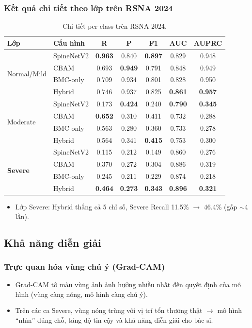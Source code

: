 \documentclass{beamer}
\numberwithin{figure}{section}
\numberwithin{table}{section}
\begin{document}
\begin{frame}
\frametitle{Kết quả chi tiết theo lớp trên RSNA 2024}
\begin{table}
\centering
\scriptsize
\setlength{\tabcolsep}{4pt}
\renewcommand{\arraystretch}{1.05}
\begin{tabular}{llccccc}
\toprule
\textbf{Lớp} & \textbf{Cấu hình} & R & P & F1 & AUC & AUPRC \\
\midrule
\multirow{4}{*}{Normal/Mild}
 & SpineNetV2 & \textbf{0.963} & 0.840 & \textbf{0.897} & 0.829 & 0.948 \\
 & CBAM       & 0.693 & \textbf{0.949} & 0.791 & 0.848 & 0.949 \\
 & BMC-only   & 0.709 & 0.934 & 0.801 & 0.828 & 0.950 \\
 & Hybrid     & 0.746 & 0.937 & 0.825 & \textbf{0.861} & \textbf{0.957} \\
\midrule
\multirow{4}{*}{Moderate}
 & SpineNetV2 & 0.173 & \textbf{0.424} & 0.240 & \textbf{0.790} & \textbf{0.345} \\
 & CBAM       & \textbf{0.652} & 0.310 & 0.411 & 0.732 & 0.288 \\
 & BMC-only   & 0.563 & 0.280 & 0.360 & 0.733 & 0.278 \\
 & Hybrid     & 0.564 & 0.341 & \textbf{0.415} & 0.753 & 0.300 \\
\midrule
\multirow{4}{*}{\textbf{Severe}}
 & SpineNetV2 & 0.115 & 0.212 & 0.149 & 0.860 & 0.276 \\
 & CBAM       & 0.370 & 0.272 & 0.304 & 0.886 & 0.319 \\
 & BMC-only   & 0.245 & 0.211 & 0.229 & 0.874 & 0.218 \\
 & Hybrid     & \textbf{0.464} & \textbf{0.273} & \textbf{0.343} & \textbf{0.896} & \textbf{0.321} \\
\bottomrule
\end{tabular}
\caption{Chi tiết per-class trên RSNA 2024.}
\end{table}
\begin{itemize}
    \item[$\rightarrow$] Lớp Severe: Hybrid thắng cả 5 chỉ số, Severe Recall 11.5\% $\to$ 46.4\% (gấp $\sim$4 lần).
\end{itemize}
\end{frame}

\subsection{Khả năng diễn giải}
\begin{frame}
\frametitle{Trực quan hóa vùng chú ý (Grad-CAM)}
\begin{itemize}
    \item[--] Grad-CAM tô màu vùng ảnh ảnh hưởng nhiều nhất đến quyết định của mô hình (vùng càng nóng, mô hình càng chú ý).
    \item[--] Trên các ca Severe, vùng nóng trùng với vị trí tổn thương thật $\rightarrow$ mô hình ``nhìn'' đúng chỗ, tăng độ tin cậy và khả năng diễn giải cho bác sĩ.
\end{itemize}
\end{frame}
\end{document}
